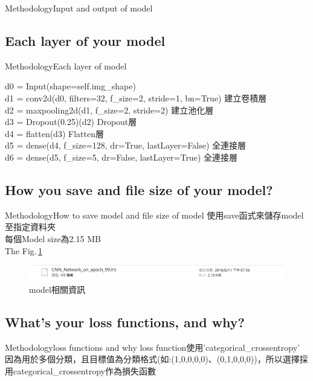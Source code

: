 \documentclass{beamer}
\begin{document}
\begin{CJK}{UTF8}{nkai}
\begin{frame}{Methodology}{Input and output of model}
 \end{frame}

\subsection{Each layer of your model}
\begin{frame}{Methodology}{Each layer of model}

d0 = Input(shape=self.img\_shape)\\
 d1 = conv2d(d0, filters=32, f\_size=2, stride=1, bn=True) 建立卷積層\\
 d2 = maxpooling2d(d1, f\_size=2, stride=2) 建立池化層\\
 d3 = Dropout(0.25)(d2) Dropout層\\
d4 = flatten(d3)  Flatten層\\
d5 = dense(d4, f\_size=128, dr=True, lastLayer=False) 全連接層\\
 d6 = dense(d5, f\_size=5, dr=False, lastLayer=True) 全連接層\\

\end{frame}

\subsection{How you save and file size of your model?}

\subsection{What's your loss functions, and why?}
\begin{frame}{Methodology}{loss functions and why}
	loss function使用'categorical\_crossentropy'\\
	因為用於多個分類，且目標值為分類格式(如:(1,0,0,0,0)、(0,1,0,0,0))，所以選擇採用categorical\_crossentropy作為損失函數
\end{frame}

\end{CJK}
\end{document}
